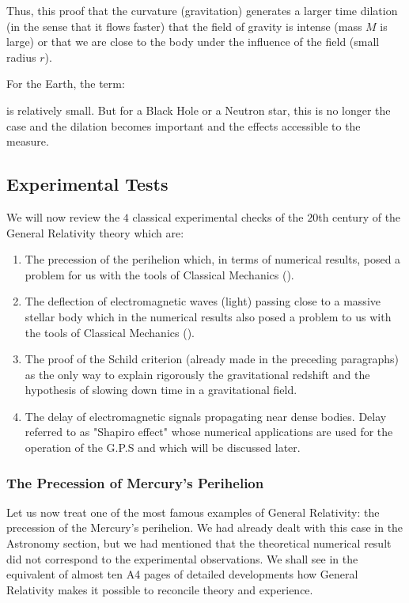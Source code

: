 	Thus, this proof that the curvature (gravitation) generates a larger time dilation (in the sense that it flows faster) that the field of gravity is intense (mass $M$ is large) or that we are close to the body under the influence of the field (small radius $r$).

	For the Earth, the term:
	
	is relatively small. But for a Black Hole or a Neutron star, this is no longer the case and the dilation becomes important and the effects accessible to the measure.
	
	\subsection{Experimental Tests}	
	We will now review the $4$ classical experimental checks of the $20$th century of the General Relativity theory which are:
	\begin{enumerate}
		\item The precession of the perihelion which, in terms of numerical results, posed a problem for us with the tools of Classical Mechanics ().

		\item The deflection of electromagnetic waves (light) passing close to a massive stellar body which in the numerical results also posed a problem to us with the tools of Classical Mechanics ().

		\item The proof of the Schild criterion (already made in the preceding paragraphs) as the only way to explain rigorously the gravitational redshift and the hypothesis of slowing down time in a gravitational field.

		\item The delay of electromagnetic signals propagating near dense bodies. Delay referred to as "Shapiro effect" whose numerical applications are used for the operation of the G.P.S and which will be discussed later.
	\end{enumerate}
	\subsubsection{The Precession of Mercury's Perihelion}
	Let us now treat one of the most famous examples of General Relativity: the precession of the Mercury's perihelion. We had already dealt with this case in the Astronomy section, but we had mentioned that the theoretical numerical result did not correspond to the experimental observations. We shall see in the equivalent of almost ten A4 pages of detailed developments how General Relativity makes it possible to reconcile theory and experience.

